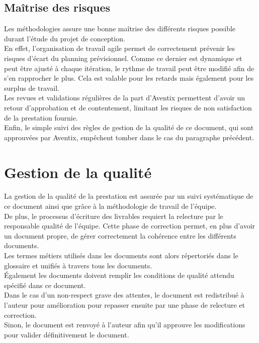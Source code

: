 \subsection{Maîtrise des risques}
Les méthodologies assure une bonne maîtrise des différents risques possible
durant l'étude du projet de conception. \\

En effet, l'organisation de travail agile permet de correctement prévenir les
risques d'écart du planning prévisionnel. Comme ce dernier est dynamique et
peut être ajusté à chaque itération, le rythme de travail peut être modifié
afin de s'en rapprocher le plus. Cela est valable pour les retards mais
également pour les surplus de travail. \\

Les revues et validations régulières de la part d'Aventix permettent d'avoir un
retour d'approbation et de contentement, limitant les risques de non
satisfaction de la prestation fournie. \\

Enfin, le simple suivi des règles de gestion de la qualité de ce document, qui
sont approuvées par Aventix, empêchent tomber dans le cas du paragraphe
précédent. \\

\section{Gestion de la qualité}
La gestion de la qualité de la prestation est assurée par un suivi systématique
de ce document ainsi que grâce à la méthodologie de travail de l'équipe. \\

De plus, le processus d'écriture des livrables requiert la relecture par le
responsable qualité de l'équipe. Cette phase de correction permet, en plus
d'avoir un document propre, de gérer correctement la cohérence entre les
différents documents. \\

Les termes métiers utilisés dans les documents sont alors répertoriés dans le
glossaire et unifiés à travers tous les documents. \\
Également les documents doivent remplir les conditions de qualité attendu
spécifié dans ce document. \\

Dans le cas d'un non-respect grave des attentes, le document est redistribué à
l'auteur pour amélioration pour repasser ensuite par une phase de relecture et
correction. \\
Sinon, le document est renvoyé à l'auteur afin qu'il approuve les modifications
pour valider définitivement le document. \\

